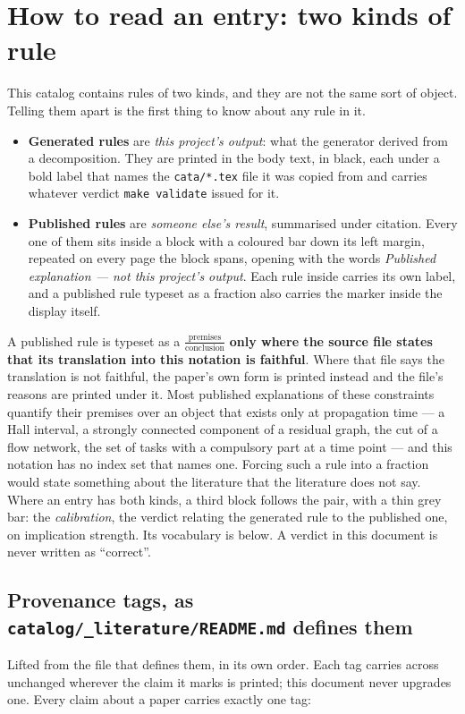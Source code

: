 \documentclass[10pt,a4paper]{article}
\begin{document}
\section{How to read an entry: two kinds of rule}\label{sec:legend}
This catalog contains rules of two kinds, and they are not the same sort of object. Telling them apart is the first thing to know about any rule in it.
\begin{itemize}\setlength{\itemsep}{0.3em}
\item \textbf{Generated rules} are \emph{this project's output}: what the generator derived from a decomposition. They are printed in the body text, in black, each under a bold label that names the \texttt{cata/*.tex} file it was copied from and carries whatever verdict \texttt{make validate} issued for it.
\item \textbf{Published rules} are \emph{someone else's result}, summarised under citation. Every one of them sits inside a block with a coloured bar down its left margin, repeated on every page the block spans, opening with the words \emph{Published explanation --- not this project's output}. Each rule inside carries its own label, and a published rule typeset as a fraction also carries the marker \textcolor{litbar}{\sffamily[published]} inside the display itself.
\end{itemize}
A published rule is typeset as a $\frac{\text{premises}}{\text{conclusion}}$ \textbf{only where the source file states that its translation into this notation is faithful}. Where that file says the translation is not faithful, the paper's own form is printed instead and the file's reasons are printed under it. Most published explanations of these constraints quantify their premises over an object that exists only at propagation time --- a Hall interval, a strongly connected component of a residual graph, the cut of a flow network, the set of tasks with a compulsory part at a time point --- and this notation has no index set that names one. Forcing such a rule into a fraction would state something about the literature that the literature does not say.
Where an entry has both kinds, a third block follows the pair, with a thin grey bar: the \emph{calibration}, the verdict relating the generated rule to the published one, on implication strength. Its vocabulary is below. A verdict in this document is never written as ``correct''.
\subsection{Provenance tags, as \texttt{catalog/\_literature/README.md} defines them}
Lifted from the file that defines them, in its own order. Each tag carries across unchanged wherever the claim it marks is printed; this document never upgrades one.
Every claim about a paper carries exactly one tag:
\end{document}
